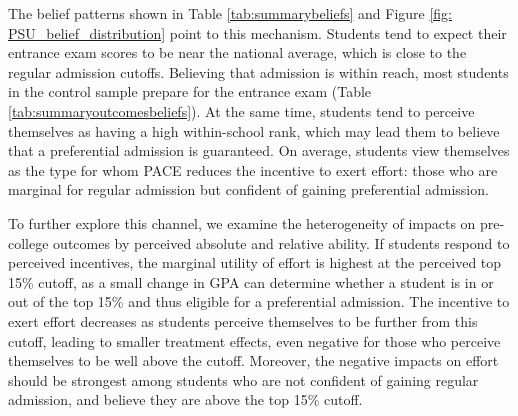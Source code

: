 The belief patterns shown in Table \ref{tab:summarybeliefs} and Figure \ref{fig: PSU_belief_distribution} point to this mechanism. Students tend to expect their entrance exam scores to be near the national average, which is close to the regular admission cutoffs. Believing that admission is within reach, most students in the control sample prepare for the entrance exam (Table \ref{tab:summaryoutcomesbeliefs}). At the same time, students tend to perceive themselves as having a high within-school rank, which may lead them to believe that a preferential admission is guaranteed. On average, students view themselves as the type for whom PACE reduces the incentive to exert effort: those who are marginal for regular admission but confident of gaining preferential admission.

To further explore this channel, we examine the heterogeneity of impacts on pre-college outcomes by perceived absolute and relative ability. If students respond to perceived incentives, the marginal utility of effort is highest at the perceived top 15\% cutoff, as a small change in GPA can determine whether a student is in or out of the top 15\% and thus eligible for a preferential admission. The incentive to exert effort decreases as students perceive themselves to be further from this cutoff, leading to smaller treatment effects, even negative for those who perceive themselves to be well above the cutoff. Moreover, the negative impacts on effort should be strongest among students who are not confident of gaining regular admission, and believe they are above the top 15\% cutoff. \par




